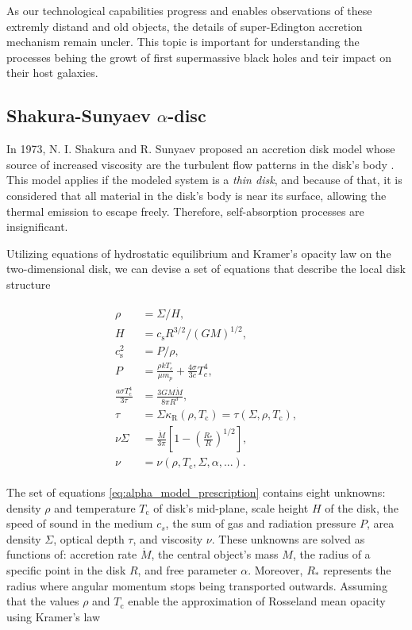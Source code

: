     As our technological capabilities progress and enables observations of these extremly distand and old objects, the details of super-Edington accretion mechanism remain uncler. This topic is important for understanding the processes behing the growt of first supermassive black holes and teir impact on their host galaxies.

\subsection[Shakura-Sunyaev $\alpha$-Disc model]{Shakura-Sunyaev $\alpha$-disc}
    \label{sec:alpha_model_definition}
    In 1973, N. I. Shakura and R. Sunyaev proposed an accretion disk model whose source of increased viscosity are the turbulent flow patterns in the disk's body \cite{shakura1973}. This model applies if the modeled system is a \emph{thin disk}, and because of that, it is considered that all material in the disk's body is near its surface, allowing the thermal emission to escape freely. Therefore, self-absorption processes are insignificant. 

    Utilizing equations of hydrostatic equilibrium and Kramer's opacity law on the two-dimensional disk, we can devise a set of equations that describe the local disk structure \cite{acpow}

    \begin{align}
    \begin{split}
        \rho &= \Sigma / H, \\
        H &= c_{\mathrm{s}} R^{3/2} / (GM)^{1/2}, \\
        c_{\mathrm{s}}^2 &= P / \rho, \\
        P &= \frac{\rho k T_{\mathrm{c}}}{\mu m_p} + \frac{4 \sigma}{3 c}T_c^4, \\
        \frac{a \sigma T_{\mathrm{c}}^4}{3 \tau} &= \frac{3GM\dot{M}}{8 \pi R^3}, \\
        \tau &= \Sigma \kappa_{\mathrm{R}}(\rho, T_{\mathrm{c}}) = \tau(\Sigma, \rho, T_{\mathrm{c}}), \\
        \nu \Sigma &= \frac{\dot{M}}{3 \pi} \left[ 1 - \left( \frac{R_*}{R} \right)^{1/2} \right], \\
        \nu &= \nu(\rho, T_{\mathrm{c}}, \Sigma, \alpha, ...).
    \end{split}
    \label{eq:alpha_model_prescription}
    \end{align}

    The set of equations \eqref{eq:alpha_model_prescription} contains eight unknowns: density $\rho$ and temperature $T_{\mathrm{c}}$ of disk's mid-plane, scale height $H$ of the disk, the speed of sound in the medium $c_s$, the sum of gas and radiation pressure $P$, area density $\Sigma$, optical depth $\tau$, and viscosity $\nu$. These unknowns are solved as functions of: accretion rate $\dot{M}$, the central object's mass $M$, the radius of a specific point in the disk $R$, and free parameter $\alpha$. Moreover, $R_*$ represents the radius where angular momentum stops being transported outwards. Assuming that the values $\rho$ and $T_{\mathrm{c}}$ enable the approximation of Rosseland mean opacity using Kramer's law

